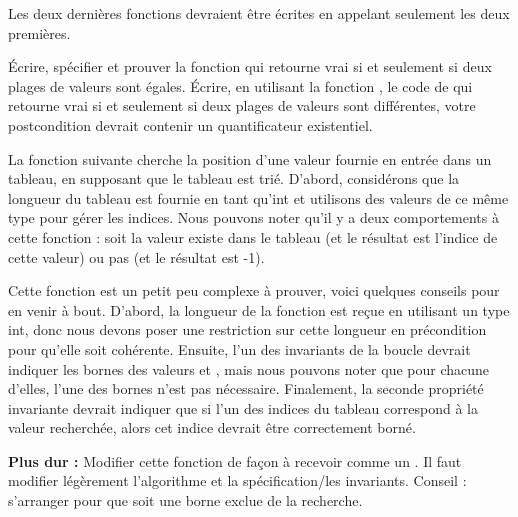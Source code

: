 Les deux dernières fonctions devraient être écrites en appelant seulement les deux
premières.





Écrire, spécifier et prouver la fonction  qui retourne vrai
si et seulement si deux plages de valeurs sont égales. Écrire, en utilisant la
fonction , le code de  qui retourne vrai
si et seulement si deux plages de valeurs sont différentes, votre postcondition
devrait contenir un quantificateur existentiel.





\label{l4:statements-loops-ex-bsearch}


La fonction suivante cherche la position d'une valeur fournie en entrée dans
un tableau, en supposant que le tableau est trié. D'abord, considérons que la
longueur du tableau est fournie en tant qu'int et utilisons des valeurs de ce
même type pour gérer les indices. Nous pouvons noter qu'il y a deux comportements
à cette fonction : soit la valeur existe dans le tableau (et le résultat est
l'indice de cette valeur) ou pas (et le résultat est -1).




Cette fonction est un petit peu complexe à prouver, voici quelques conseils
pour en venir à bout. D'abord, la longueur de la fonction est reçue en utilisant
un type int, donc nous devons poser une restriction sur cette longueur en
précondition pour qu'elle soit cohérente. Ensuite, l'un des invariants de la
boucle devrait indiquer les bornes des valeurs  et
, mais nous pouvons noter que pour chacune d'elles, l'une des
bornes n'est pas nécessaire. Finalement, la seconde propriété invariante
devrait indiquer que si l'un des indices du tableau correspond à la valeur
recherchée, alors cet indice devrait être correctement borné.

\textbf{Plus dur :} Modifier cette fonction de façon à recevoir 
comme un . Il faut modifier légèrement l'algorithme et
la spécification/les invariants. Conseil : s'arranger pour que 
soit une borne exclue de la recherche.




